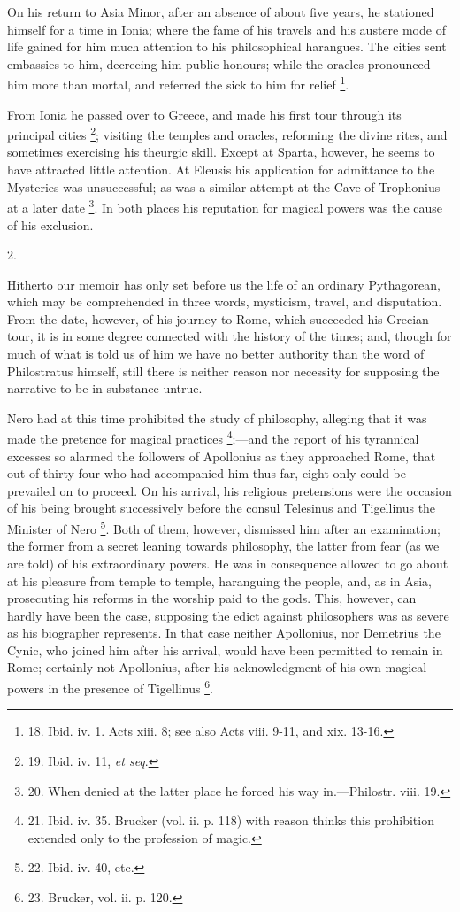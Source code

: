 On his return to Asia Minor,
after an absence of about five years, he stationed himself for a time
in Ionia; where the fame of his travels and his austere mode of life
gained for him much attention to his philosophical harangues. The
cities sent embassies to him, decreeing him public honours; while the
oracles pronounced him more than mortal, and referred the sick to him
for relief \footnote{18.
Ibid. iv. 1. Acts xiii. 8; see also Acts viii. 9-11, and xix. 13-16.}.

From Ionia he passed over to
Greece, and made his first tour through its principal cities \footnote{19.
Ibid. iv. 11, \emph{et seq}.}; visiting the temples and oracles, reforming the divine rites,
and sometimes exercising his theurgic skill. Except at Sparta,
however, he seems to have attracted little attention. At Eleusis his
application for admittance to the Mysteries was unsuccessful; as was a
similar attempt at the Cave of Trophonius at a later date \footnote{20.
When denied at the latter place he forced his way in.—Philostr.
viii. 19.}. In both places his reputation for magical powers was the
cause of his exclusion.

2.

Hitherto our memoir has only
set before us the life of an ordinary Pythagorean, which may be
comprehended in three words, mysticism, travel, and disputation. From
the date, however, of his journey to Rome, which succeeded his Grecian
tour, it is in some degree connected with the history of the times;
and, though for much of what is told us of him we have no better
authority than the word of Philostratus himself, still there is
neither reason nor necessity for supposing the narrative to be in
substance untrue.

Nero had at this time
prohibited the study of philosophy, alleging that it was made the
pretence for magical practices \footnote{21.
Ibid. iv. 35. Brucker (vol. ii. p. 118) with reason thinks this
prohibition extended only to the profession of magic.};—and the report of his tyrannical excesses so alarmed the
followers of Apollonius as they approached Rome, that out of
thirty-four who had accompanied him thus far, eight only could be
prevailed on to proceed. On his arrival, his religious pretensions
were the occasion of his being brought successively before the consul
Telesinus and Tigellinus the Minister of Nero \footnote{22.
Ibid. iv. 40, etc.}. Both of them, however, dismissed him after an examination;
the former from a secret leaning towards philosophy, the latter from
fear (as we are told) of his extraordinary powers. He was in
consequence allowed to go about at his pleasure from temple to temple,
haranguing the people, and, as in Asia, prosecuting his reforms in the
worship paid to the gods. This, however, can hardly have been the
case, supposing the edict against philosophers was as severe as his
biographer represents. In that case neither Apollonius, nor Demetrius
the Cynic, who joined him after his arrival, would have been permitted
to remain in Rome; certainly not Apollonius, after his
acknowledgment of his own magical powers in the presence of Tigellinus
\footnote{23.
Brucker, vol. ii. p. 120.}.

